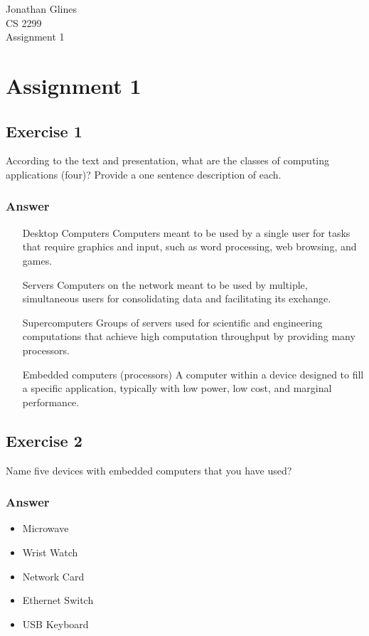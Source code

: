 \documentclass[12pt]{article}
\begin{document}
\begin{flushright}
{\Large Jonathan Glines \\
CS 2299 \\
Assignment 1 \\
}
\end{flushright}
\section*{Assignment 1}
\subsection*{Exercise 1}
According to the text and presentation, what are the classes of computing applications (four)? Provide a one sentence description of each.
\subsubsection*{Answer}
\begin{itemize}
\item[Desktop Computers] Computers meant to be used by a single user for tasks that require graphics and input, such as word processing, web browsing, and games.
\item[Servers] Computers on the network meant to be used by multiple, simultaneous users for consolidating data and facilitating its exchange.
\item[Supercomputers] Groups of servers used for scientific and engineering computations that achieve high computation throughput by providing many processors.
\item[Embedded computers (processors)] A computer within a device designed to fill a specific application, typically with low power, low cost, and marginal performance.
\end{itemize}

\subsection*{Exercise 2}
Name five devices with embedded computers that you have used?
\subsubsection*{Answer}
\begin{itemize}
\item Microwave
\item Wrist Watch
\item Network Card
\item Ethernet Switch
\item USB Keyboard
\end{itemize}
\end{document}
